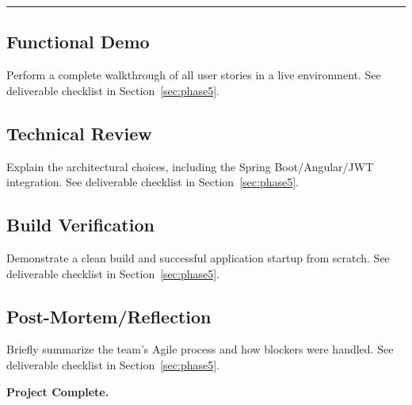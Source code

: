 \medskip
\noindent\rule{\linewidth}{0.4pt}
\medskip

\subsection{Functional Demo}\label{sec:functional-demo}
Perform a complete walkthrough of all user stories in a live environment.
See deliverable checklist in Section~\ref{sec:phase5}.

\subsection{Technical Review}\label{sec:technical-review}
Explain the architectural choices, including the Spring Boot/Angular/JWT integration.
See deliverable checklist in Section~\ref{sec:phase5}.

\subsection{Build Verification}\label{sec:build-verification}
Demonstrate a clean build and successful application startup from scratch.
See deliverable checklist in Section~\ref{sec:phase5}.

\subsection{Post-Mortem/Reflection}\label{sec:post-mortem}
Briefly summarize the team's Agile process and how blockers were handled.
See deliverable checklist in Section~\ref{sec:phase5}.

\vfill
\noindent\textbf{Project Complete.}
